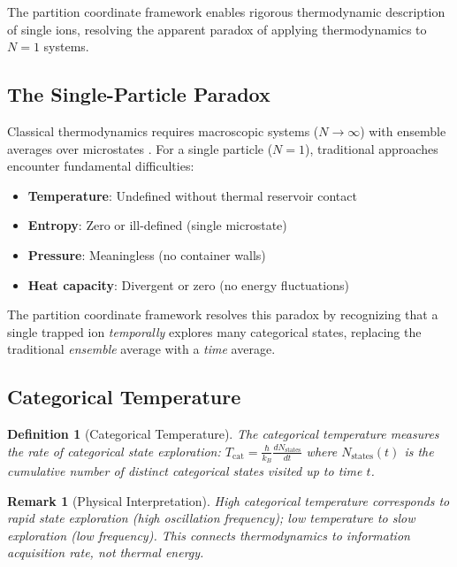 \documentclass[twocolumn,10pt]{article}
\newtheorem{definition}[theorem]{Definition}
\newtheorem{remark}[theorem]{Remark}
\begin{document}
The partition coordinate framework enables rigorous thermodynamic description of single ions, resolving the apparent paradox of applying thermodynamics to $N=1$ systems.

\subsection{The Single-Particle Paradox}

Classical thermodynamics requires macroscopic systems ($N \to \infty$) with ensemble averages over microstates \citep{landau1980statistical,gibbs1902elementary}. For a single particle ($N = 1$), traditional approaches encounter fundamental difficulties:
\begin{itemize}
    \item \textbf{Temperature}: Undefined without thermal reservoir contact
    \item \textbf{Entropy}: Zero or ill-defined (single microstate)
    \item \textbf{Pressure}: Meaningless (no container walls)
    \item \textbf{Heat capacity}: Divergent or zero (no energy fluctuations)
\end{itemize}

The partition coordinate framework resolves this paradox by recognizing that a single trapped ion \emph{temporally} explores many categorical states, replacing the traditional \emph{ensemble} average with a \emph{time} average.

\subsection{Categorical Temperature}

\begin{definition}[Categorical Temperature]
\label{def:cattemp}
The \emph{categorical temperature} measures the rate of categorical state exploration:
$
T_{\mathrm{cat}} = \frac{\hbar}{k_B} \frac{dN_{\mathrm{states}}}{dt}
$
where $N_{\mathrm{states}}(t)$ is the cumulative number of distinct categorical states visited up to time $t$.
\end{definition}

\begin{remark}[Physical Interpretation]
High categorical temperature corresponds to rapid state exploration (high oscillation frequency); low temperature to slow exploration (low frequency). This connects thermodynamics to \emph{information acquisition rate}, not thermal energy.
\end{remark}
\end{document}
